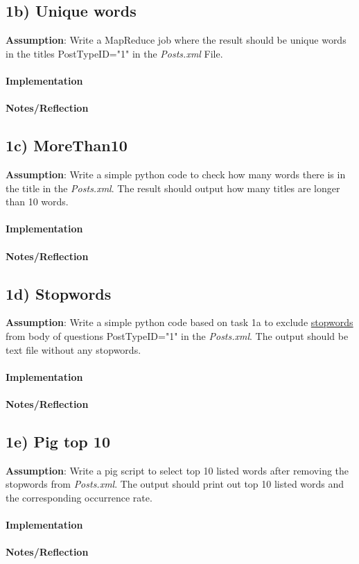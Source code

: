 \documentclass[fleqn,10pt]{wlscirep}
\begin{document}
\subsection*{1b) Unique words}
\textbf{Assumption}: Write a MapReduce job where the result should be unique words in the titles PostTypeID="1" in the \textit{Posts.xml} File. \\ \\
\textbf{Implementation}  \\ \\
\textbf{Notes/Reflection}

\subsection*{1c) MoreThan10}
\textbf{Assumption}: Write a simple python code to check how many words there is in the title in the \textit{Posts.xml}. The result should output how many titles are longer than 10 words.  \\ \\
\textbf{Implementation}  \\ \\
\textbf{Notes/Reflection}

\subsection*{1d) Stopwords}
\textbf{Assumption}: Write a simple python code based on task 1a to exclude \href{https://raw.githubusercontent.com/naimdjon/stopwords/master/stopwords.txt}{stopwords} from body of questions PostTypeID="1" in the \textit{Posts.xml}. The output should be text file without any stopwords. \\ \\
\textbf{Implementation}  \\ \\
\textbf{Notes/Reflection}

\subsection*{1e) Pig top 10}
\textbf{Assumption}: Write a pig script to select top 10 listed words after removing the stopwords from \textit{Posts.xml}. The output should print out top 10 listed words and the corresponding occurrence rate.\\ \\
\textbf{Implementation}  \\ \\
\textbf{Notes/Reflection}
\end{document}
